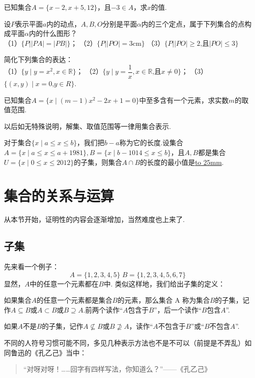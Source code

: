 \documentclass[lang=cn,math=cm,chinesefont=nofont,11pt,scheme=chinese,twocol]{elegantbook}
\begin{document}
\begin{exercise}\label{exer:6}
  已知集合$A=\{x-2,x+5,12\}$，且$-3\in A$，求$x$的值.
\end{exercise}

\begin{exercise}\label{exer:7}
  设$P$表示平面$a$内的动点，$A,B,O$分别是平面$\alpha$内的三个定点，属于下列集合的点构成平面$\alpha$内的什么图形？\\
  （1）$\{P||PA|=|PB|\}$；
  （2）$\{P||PO|=3\text{cm}\}$
  （3）$\{P||PO|\geqslant2\text{,且}|PO|\leqslant3\}$
\end{exercise}

\begin{exercise}\label{exer:8}
  简化下列集合的表达：\\
  （1）$\{y\mid y=x^2,x\in\mathbb{R}\}$；
  （2）$\{y\mid y=\dfrac{1}{x},x\in\mathbb{R}\text{,且}x\neq0\}$；
  （3）$\{(x,y)\mid x=0\text{,}y\in R\}$.
\end{exercise}

\begin{exercise}\label{exer:9}
  已知集合$A=\{x\mid(m-1)x^2-2x+1=0\}$中至多含有一个元素，求实数$m$的取值范围.
\end{exercise}
\begin{remark}
  以后如无特殊说明，解集、取值范围等一律用集合表示.
\end{remark}

\begin{exercise}\label{exer:202406261951}
  对于集合$\{x\mid a\leq x\leq b\}$，我们把$b-a$称为它的长度.设集合$A=\{x\mid a\leq x\leq a+1981\},B=\{x\mid b-1014\leq x\leq b\}$，且$A,B$都是集合$U=\{x\mid 0\leq x\leq 2012\}$的子集，则集合$A\cap B$的长度的最小值是\underline{\hbox to 25mm{}}.
\end{exercise}

\section{集合的关系与运算}
从本节开始，证明性的内容会逐渐增加，当然难度也上来了.
\subsection{子集}
先来看一个例子：$$A=\{1,2,3,4,5\}\;B=\{1,2,3,4,5,6,7\}$$
显然，$A$中的任意一个元素都在$B$中.
类似这样地，我们给出子集的定义：
\begin{definition}[子集]
  如果集合$A$的任意一个元素都是集合$B$的元素，那么集合 A 称为集合$B$的子集，记作$A\subseteq B$或$A\subset B$或$B\supseteq A$.前两个读作“$A$包含于$B$”，后一个读作“$B$包含$A$”.

  如果$A$不是$B$的子集，记作$A\nsubseteq B$或$B\nsupseteq A$，读作“$A$不包含于$B$”或“$B$不包含$A$”.
\end{definition}
不同的人符号习惯可能不同，多见几种表示方法也不是不可以（前提是不弄乱）如同鲁迅的《孔乙己》当中：
\begin{quotation}
  “对呀对呀！……回字有四样写法，你知道么？”——《孔乙己》
\end{quotation}
\end{document}
